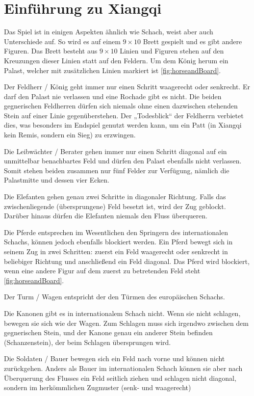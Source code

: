 \documentclass[
  manuscript=article,  %
  layout=publish,  %
  year=2023,
  volume=1,
]{extra/joas}
\begin{document}
\section{Einführung zu Xiangqi}\label{sec:introtoxiangqi}
Das Spiel ist in einigen Aspekten ähnlich wie Schach, weist aber auch Unterschiede auf. So wird es auf einem $9 \times 10$ Brett gespielt und es gibt andere Figuren.
Das Brett besteht aus $9 \times 10$ Linien und Figuren stehen auf den Kreuzungen dieser Linien statt auf den Feldern. Um dem König herum ein Palast, welcher mit zusätzlichen Linien markiert ist \ref{fig:horseandBoard}.


Der Feldherr / König geht immer nur einen Schritt waagerecht oder senkrecht. Er darf den Palast nie verlassen und eine Rochade gibt es nicht. Die beiden gegnerischen Feldherren dürfen sich niemals ohne einen dazwischen stehenden Stein auf einer Linie gegenüberstehen. Der „Todesblick“ der Feldherrn verbietet dies, was besonders im Endspiel genutzt werden kann, um ein Patt (in Xiangqi kein Remis, sondern ein Sieg) zu erzwingen.

Die Leibwächter / Berater gehen immer nur einen Schritt diagonal auf ein unmittelbar benachbartes Feld und dürfen den Palast ebenfalls nicht verlassen. Somit stehen beiden zusammen nur fünf Felder zur Verfügung, nämlich die Palastmitte und dessen vier Ecken.

Die Elefanten gehen genau zwei Schritte in diagonaler Richtung. Falls das zwischenliegende (übersprungene) Feld besetzt ist, wird der Zug geblockt. Darüber hinaus dürfen die Elefanten niemals den Fluss überqueren.

Die Pferde entsprechen im Wesentlichen den Springern des internationalen Schachs, können jedoch ebenfalls blockiert werden. Ein Pferd bewegt sich in seinem Zug in zwei Schritten: zuerst ein Feld waagerecht oder senkrecht in beliebiger Richtung und anschließend ein Feld diagonal. Das Pferd wird blockiert, wenn eine andere Figur auf dem zuerst zu betretenden Feld steht \ref{fig:horseandBoard}.

 Der Turm / Wagen entspricht der den Türmen des europäischen Schachs. 
 
 Die Kanonen gibt es in internationalem Schach nicht. Wenn sie nicht schlagen, bewegen sie sich wie der Wagen. Zum Schlagen muss sich irgendwo zwischen dem gegnerischen Stein, und der Kanone genau ein anderer Stein befinden (Schanzenstein), der beim Schlagen übersprungen wird.
 
 Die Soldaten / Bauer bewegen sich ein Feld nach vorne und können nicht zurückgehen. Anders als Bauer im internationalen Schach können sie aber nach Überquerung des Flusses ein Feld seitlich ziehen und schlagen nicht diagonal, sondern im herkömmlichen Zugmuster (senk- und waagerecht)
\end{document}
